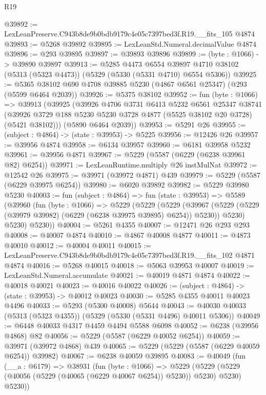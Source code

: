 \begin{lexlean}{R19}
\begin{coremodule}
@39892 := LexLeanPreserve.C943b8de9b0bdb9179c4e05c7397bed3f.R19.__fits_105 @4874
@39893 := @5268 @39892
@39895 := LexLeanStd.Numeral.decimalValue @4874
@39896 := @293 @39895
@39897 := @39893 @39896
@39899 := (byte : @1066) -> @39890 @39897
@39913 := @5285
    @4473
    @6554
    @39897
    @4710
    @38102
    (@5313 (@5323 @4473))
    (@5329 (@5330 (@5331 @4710) @6554 @5306))
@39925 := @5365 @38102 @690 @4708 @39885 @5230 (@4867 @6561 @25347) (@293 (@5599 @6464 @2039))
@39926 := @5375 @38102
@39952 := fun (byte : @1066) =>
  @39913
    (@39925
      (@39926
        @4706
        @3731
        @6413
        @5232
        @6561
        @25347
        @38741
        (@39926 @3729 @188 @5230 @5230 @3728 @4877 (@5525 @38102 @20 @3728) (@5421 @38102)))
      (@5890 @6464 @2039))
@39953 := @5291 @26
@39955 := (subject : @4864) -> (state : @39953) -> @5225
@39956 := @12426 @26
@39957 := @39956 @4874
@39958 := @6134 @39957
@39960 := @6181 @39958 @5232
@39961 := @39956 @4871
@39967 := @5229 (@5587 (@6229 (@6238 @39961 @82) @6254))
@39971 := LexLeanRuntime.multiply @26 instMulNat
@39972 := @12542 @26
@39975 := @39971 (@39972 @4871) @439
@39979 := @5229 (@5587 (@6229 @39975 @6254))
@39980 := @6020 @39892
@39982 := @5229 @39980 @5230
@40003 := fun (subject : @4864) =>
  fun (state : @39953) =>
  @5589
    (@39960
      (fun (byte : @1066) =>
      @5229
        (@5229
          (@5229
            (@39967 (@5229 (@5229 (@39979 @39982) (@6229 (@6238 @39975 @39895) @6254)) @5230))
            @5230)
          @5230)
        @5230))
@40004 := @5261 @4355
@40007 := @12471 @26 @293 @293
@40008 := @40007 @4874
@40010 := @4867 @40008 @4877
@40011 := @4873 @40010
@40012 := @40004 @40011
@40015 := LexLeanPreserve.C943b8de9b0bdb9179c4e05c7397bed3f.R19.__fits_102 @4871 @4874
@40016 := @5268 @40015
@40018 := @5063 @39953 @40007
@40019 := LexLeanStd.Numeral.accumulate
@40021 := @40019 @4871 @4874
@40022 := @40018 @40021
@40023 := @40016 @40022
@40026 := (subject : @4864) -> (state : @39953) -> @40012 @40023
@40030 := @5285 @4355 @40011 @40023 @4496
@40033 := @5293 (@5300 @40008) @5644
@40043 := @40030 @40033 (@5313 (@5323 @4355)) (@5329 (@5330 (@5331 @4496) @40011 @5306))
@40049 := @6448 @40033 @4317 @4459 @4494 @5588 @6098
@40052 := @6238 (@39956 @4868) @82
@40056 := @5229 (@5587 (@6229 @40052 @6254))
@40059 := @39971 (@39972 @4868) @439
@40065 := @5229 (@5229 (@5587 (@6229 @40059 @6254)) @39982)
@40067 := @6238 @40059 @39895
@40083 := @40049
    (fun (__a : @6179) =>
    @38931
      (fun (byte : @1066) =>
      @5229 (@5229 (@5229 (@40056 (@5229 (@40065 (@6229 @40067 @6254)) @5230)) @5230) @5230) @5230))

\end{coremodule}
\end{lexlean}
